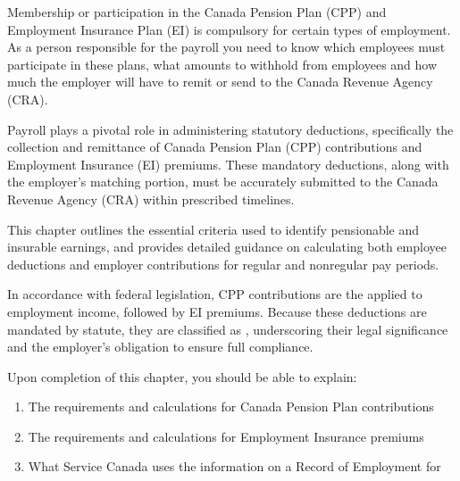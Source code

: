\documentclass[letterpaper,10pt,english]{sphinxmanual}
\begin{document}
\sphinxstepscope

\sphinxAtStartPar
Membership or participation in the Canada Pension Plan (CPP) and Employment Insurance
Plan (EI) is compulsory for certain types of employment. As a person responsible for the payroll
you need to know which employees must participate in these plans, what amounts to withhold
from employees and how much the employer will have to remit or send to the Canada
Revenue Agency (CRA).

\sphinxAtStartPar
Payroll plays a pivotal role in administering statutory deductions, specifically the collection and remittance of
Canada Pension Plan (CPP) contributions and Employment Insurance (EI) premiums. These mandatory deductions, along with the
employer’s matching portion, must be accurately submitted to the Canada Revenue Agency (CRA) within prescribed timelines.

\sphinxAtStartPar
This chapter outlines the essential criteria used to identify pensionable and insurable earnings, and provides detailed
guidance on calculating both employee deductions and employer contributions for regular and non\sphinxhyphen{}regular pay periods.

\sphinxAtStartPar
In accordance with federal legislation, CPP contributions are the  applied to employment income,
followed by EI premiums. Because these deductions are mandated by statute, they are classified as ,
underscoring their legal significance and the employer’s obligation to ensure full compliance.

\sphinxAtStartPar
{}

\sphinxAtStartPar
Upon completion of this chapter, you should be able to explain:
\begin{enumerate}
%
\item {} 
\sphinxAtStartPar
The requirements and calculations for Canada Pension Plan contributions

\item {} 
\sphinxAtStartPar
The requirements and calculations for Employment Insurance premiums

\item {} 
\sphinxAtStartPar
What Service Canada uses the information on a Record of Employment for

\end{enumerate}
\end{document}
